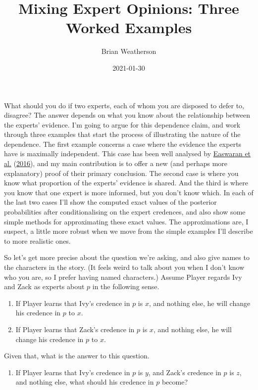 \documentclass[
  12pt,
]{article}
\title{Mixing Expert Opinions: Three Worked Examples}
\author{Brian Weatherson}
\date{2021-01-30}
\providecommand{\tightlist}{%
  \setlength{\itemsep}{0pt}\setlength{\parskip}{0pt}}
\begin{document}
\maketitle

What should you do if two experts, each of whom you are disposed to
defer to, disagree? The answer depends on what you know about the
relationship between the experts' evidence. I'm going to argue for this
dependence claim, and work through three examples that start the process
of illustrating the nature of the dependence. The first example concerns
a case where the evidence the experts have is maximally independent.
This case has been well analysed by
\protect\hyperlink{ref-EaswaranEtAl2016}{Easwaran et al.}
(\protect\hyperlink{ref-EaswaranEtAl2016}{2016}), and my main
contribution is to offer a new (and perhaps more explanatory) proof of
their primary conclusion. The second case is where you know what
proportion of the experts' evidence is shared. And the third is where
you know that one expert is more informed, but you don't know which. In
each of the last two cases I'll show the computed exact values of the
posterior probabilities after conditionalising on the expert credences,
and also show some simple methods for approximating these exact values.
The approximations are, I suspect, a little more robust when we move
from the simple examples I'll describe to more realistic ones.

So let's get more precise about the question we're asking, and also give
names to the characters in the story. (It feels weird to talk about you
when I don't know who you are, so I prefer having named characters.)
Assume Player regards Ivy and Zack as experts about \(p\) in the
following sense.

\begin{enumerate}
\def\labelenumi{(\arabic{enumi})}
\tightlist
\item
  If Player learns that Ivy's credence in \(p\) is \(x\), and nothing
  else, he will change his credence in \(p\) to \(x\).
\item
  If Player learns that Zack's credence in \(p\) is \(x\), and nothing
  else, he will change his credence in \(p\) to \(x\).
\end{enumerate}

Given that, what is the answer to this question.

\begin{enumerate}
\def\labelenumi{(\arabic{enumi})}
\setcounter{enumi}{2}
\tightlist
\item
  If Player learns that Ivy's credence in \(p\) is \(y\), and Zack's
  credence in \(p\) is \(z\), and nothing else, what should his credence
  in \(p\) become?
\end{enumerate}
\end{document}
